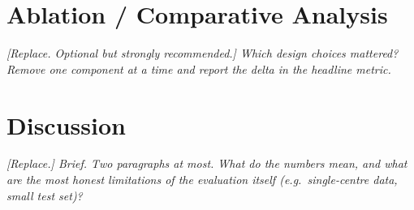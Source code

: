 \section{Ablation / Comparative Analysis}
\label{sec:results-ablation}

\textit{[Replace. Optional but strongly recommended.] Which design choices
mattered? Remove one component at a time and report the delta in the
headline metric.}

\section{Discussion}
\label{sec:results-discussion}

\textit{[Replace.] Brief. Two paragraphs at most. What do the numbers mean,
and what are the most honest limitations of the evaluation itself (e.g.\
single-centre data, small test set)?}

